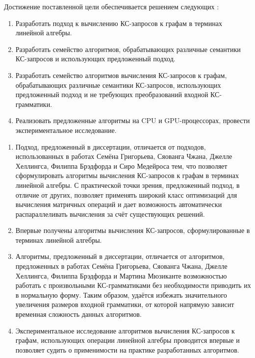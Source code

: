 Достижение поставленной цели обеспечивается решением следующих {\tasks}:
\begin{enumerate}[beginpenalty=10000] %
  \item Разработать подход к вычислению КС-запросов к графам в терминах линейной алгебры.
  \item Разработать семейство алгоритмов, обрабатывающих различные семантики КС-запросов и использующих предложенный подход.
  \item Разработать семейство алгоритмов вычисления КС-запросов к графам, обрабатывающих различные семантики КС-запросов, использующих предложенный подход и не требующих преобразований входной КС-грамматики.
  \item Реализовать предложенные алгоритмы на CPU и GPU-процессорах, провести экспериментальное исследование.
\end{enumerate}


{\novelty}
\begin{enumerate}[beginpenalty=10000] %
	
	\item Подход, предложенный в диссертации, отличается от подходов, использованных в работах Семёна Григорьева, Сяованга Чжана, Джелле Хеллингса, Филиппа Брэдфорда и Сиро Медейроса тем, что позволяет сформулировать алгоритмы вычисления КС-запросов к графам в терминах линейной алгебры. С практической точки зрения, предложенный подход, в отличие от других, позволяет применять широкий класс оптимизаций для вычисления матричных операций и дает возможность автоматически распараллеливать вычисления за счёт существующих решений.
	
	\item Впервые получены алгоритмы вычисления КС-запросов, сформулированные в терминах линейной алгебры.
	
	\item Алгоритмы, предложенный в диссертации, отличается от алгоритмов, предложенных в работах Семёна Григорьева, Сяованга Чжана, Джелле Хеллингса, Филиппа Брэдфорда и Мартина Мюзиканте возможностью работать с произвольными КС-грамматиками без необходимости приводить их в нормальную форму. Таким образом, удаётся избежать значительного увеличения размеров входной грамматики, от которой напрямую зависит временная сложность данных алгоритмов.
	
	\item Экспериментальное исследование алгоритмов вычисления КС-запросов к графам, использующих операции линейной алгебры проводится впервые и позволяет судить о применимости на практике разработанных алгоритмов.
	
\end{enumerate}

